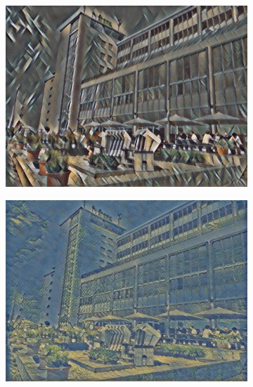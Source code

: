 \begin{figure}[H]
\begin{subfigure}[h]{0.21\textwidth}
        \includegraphics[width=\textwidth]{resources/content/experiments/htw-vgg16_still_life_with_liqueur_bottle.jpg}
    \end{subfigure}
    \begin{subfigure}[h]{0.21\textwidth}
        \centering
        \includegraphics[width=\textwidth]{resources/content/experiments/htw-vgg16_the_olive_trees.jpg}
    \end{subfigure}



\end{figure}
